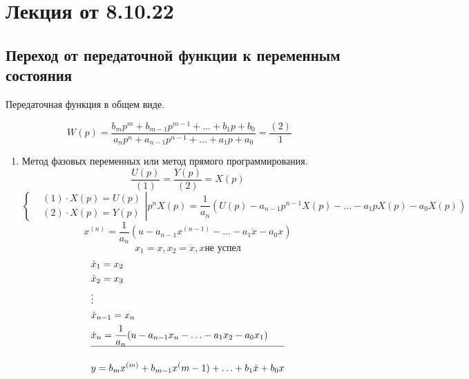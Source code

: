 \section{Лекция от 8.10.22}
\subsection{Переход от передаточной функции к переменным состояния}
Передаточная функция в общем виде.\par
\[W(p) = \frac{b_mp^m + b_{m-1}p^{m-1} + \ldots + b_1p + b_0}
{a_np^n + a_{n-1}p^{n-1} + \ldots + a_1p +a_0} = \frac{(2)}{1}\]
\begin{enumerate}
	\item Метод фазовых переменных или метод прямого программирования.
		\[\frac{U(p)}{(1)} = \frac{Y(p)}{(2)} = X(p)\]
		\[\left\{\begin{aligned} 
				&(1)\cdot X(p) = U(p)\\
				&(2) \cdot X(p) = Y(p)
				    \end{aligned}\right| p^nX(p) = \frac{1}{a_n}(U(p) - a_{n-1}p^{n-1}X(p) - \ldots - a_1pX(p) - a_0X(p))\]
		\[x^{(n)} = \frac{1}{a_n}(u - a_{n-1}x^{(n-1)} - \ldots - a_1 \dot x - a_0x)\]
		\[x_1 = x, x_2 = \dot x, x \text{не успел}\]
		\[\begin{aligned} 
			&\dot x_1 = x_2\\
			&\dot x_2 = x_3\\
			&\vdots\\
			&\dot x_{n-1} = x_n\\
			&\dot x_n = \frac{1}{a_n}(u - a_{n-1}x_n - \ldots - a_1x_2 - a_0x_1)\\
			\hline\\
			&y =  b_mx^{(m)} + b_{m-1}x^(m-1) + \ldots + b_1\dot x + b_0x
		\end{aligned}\]


\end{enumerate}
